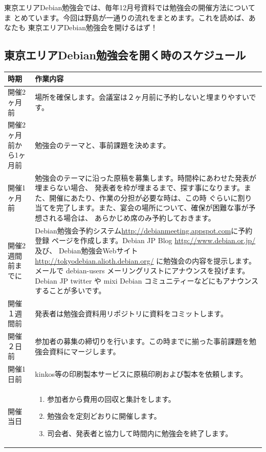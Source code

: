 \documentclass[mingoth,a4paper]{jsarticle}
\begin{document}
東京エリアDebian勉強会では、毎年12月号資料では勉強会の開催方法についてま
とめています。今回は野島が一通りの流れをまとめます。これを読めば、あなたも
東京エリアDebian勉強会を開けるはず！

\subsection{東京エリアDebian勉強会を開く時のスケジュール}


\begin{table}[ht]
\begin{center}
\small
\begin{tabular}{|p{12em}|p{31em}|}
\hline
時期&作業内容 \\
\hline\hline
開催2ヶ月前 & 場所を確保します。会議室は２ヶ月前に予約しないと埋まりやすいです。\\
\hline
開催2ヶ月前から1ヶ月前 & 勉強会のテーマと、事前課題を決めます。\\
\hline
開催1ヶ月前 & 勉強会のテーマに沿った原稿を募集します。時間枠にあわせた発表が埋まらない場合、
発表者を枠が埋まるまで、探す事になります。また、開催にあたり、作業の分担が必要な時は、この時
ぐらいに割り当てを完了します。また、宴会の場所について、確保が困難な事が予想される場合は、
あらかじめ席のみ予約しておきます。\\
\hline
開催2週間前までに & Debian勉強会予約システム\url{http://debianmeeting.appspot.com}に予約登録
ページを作成します。Debian JP Blog \url{http://www.debian.or.jp/}及び、
Debian勉強会Webサイト \url{http://tokyodebian.alioth.debian.org/} に勉強会の内容を提示します。
メールで debian-users メーリングリストにアナウンスを投げます。
Debian JP twitter や mixi Debian コミュニティーなどにもアナウンスすることが多いです。\\
\hline
開催１週間前 & 発表者は勉強会資料用リポジトリに資料をコミットします。\\
\hline
開催２日前　& 参加者の募集の締切りを行います。この時までに揃った事前課題を勉強会資料にマージします。\\
\hline
開催1日前　& kinkos等の印刷製本サービスに原稿印刷および製本を依頼します。\\
\hline
開催当日　& \begin{enumerate}
  \item 参加者から費用の回収と集計をします。
  \item 勉強会を定刻どおりに開催します。
  \item 司会者、発表者と協力して時間内に勉強会を終了します。

\end{enumerate}
\end{tabular}
\end{center}
\end{table}
\end{document}
